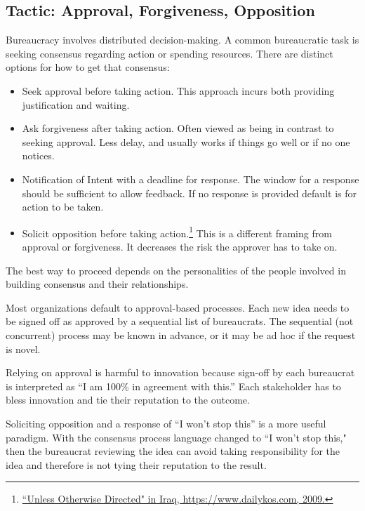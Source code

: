 \subsection*{Tactic: Approval, Forgiveness, Opposition\label{sec:approval-forgiveness-opposition}}

Bureaucracy involves distributed decision-making. 
A common bureaucratic task is seeking consensus regarding action or spending resources. There are distinct options for how to get that consensus:
\begin{itemize}
    \item Seek approval before taking action. This approach incurs both providing justification and waiting.
    \item Ask forgiveness after taking action. Often viewed as being in contrast to seeking approval. Less delay, and usually works if things go well or if no one notices. 
    \item Notification of Intent with a deadline for response. The window for a response should be sufficient to  allow feedback. If no response is provided default is for action to be taken.
    \item Solicit opposition before taking action.\footnote{\href{https://www.dailykos.com/stories/2009/2/11/696188/-}{``Unless Otherwise Directed" in Iraq, https://www.dailykos.com, 2009.}} This is a different framing from approval or forgiveness. It decreases the risk the approver has to take on.
\end{itemize}
The best way to proceed depends on the personalities of the people involved in building consensus and their relationships. 

Most organizations default to approval-based  processes. Each new idea needs to be signed off as approved by a sequential list of \glspl{bureaucrat}. The sequential (not concurrent) process may be known in advance, or it may be ad hoc if the request is novel.

Relying on approval is harmful to innovation because sign-off by each bureaucrat is interpreted as ``I am 100\% in agreement with this.'' Each stakeholder has to bless innovation and tie their reputation to the outcome.

Soliciting opposition and a response of ``I won't stop this'' is a more useful paradigm. With the consensus process language changed to ``I won't stop this," then the bureaucrat reviewing the idea can avoid taking responsibility for the idea and therefore is not tying their reputation to the result.




